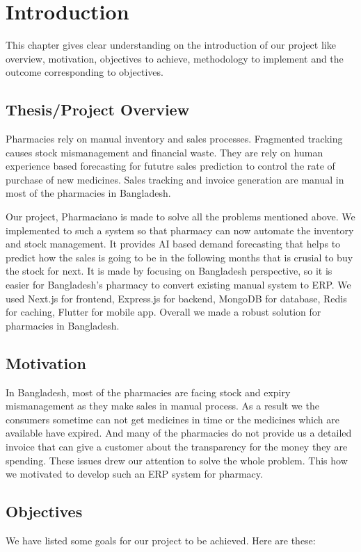 \chapter{Introduction}

This chapter gives clear understanding on the introduction of our project like overview, motivation, objectives to achieve, methodology to implement and the outcome corresponding to objectives.

\section{Thesis/Project Overview}
Pharmacies rely on manual inventory and sales processes. Fragmented tracking causes stock mismanagement and financial waste. They are rely on human experience based forecasting for fututre sales prediction to control the rate of purchase of new medicines. Sales tracking and invoice generation are manual in most of the pharmacies in Bangladesh.


Our project, Pharmaciano is made to solve all the problems mentioned above. We implemented to such a system so that pharmacy can now automate the inventory and stock management. It provides AI based demand forecasting that helps to predict how the sales is going to be in the following months that is crusial to buy the stock for next. It is made by focusing on Bangladesh perspective, so it is easier for Bangladesh's pharmacy to convert existing manual system to ERP. We used Next.js for frontend, Express.js for backend, MongoDB for database, Redis for caching, Flutter for mobile app. Overall we made a robust solution for pharmacies in Bangladesh.


\section{Motivation}
In Bangladesh, most of the pharmacies are facing stock and expiry mismanagement as they make sales in manual process. As a result we the consumers sometime can not get medicines in time or the medicines which are available have expired. And many of the pharmacies do not provide us a detailed invoice that can give a customer about the transparency for the money they are spending. These issues drew our attention to solve the whole problem. This how we motivated to develop such an ERP system for pharmacy. 

\section{Objectives}
We have listed some goals for our project to be achieved. Here are these:

